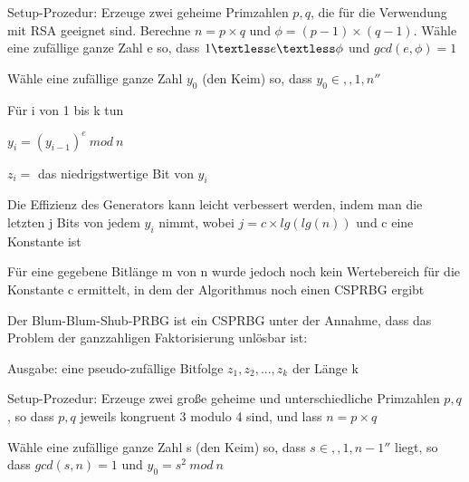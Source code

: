 \documentclass[a4paper]{article}
\begin{document}
\begin{multicols}{3}
\begin{itemize*}
\begin{itemize*}
            \end{itemize*}
            \begin{enumerate*}
                  \item Setup-Prozedur: Erzeuge zwei geheime Primzahlen $p, q$, die für die Verwendung mit RSA geeignet sind. Berechne $n=p\times q$ und $\phi=(p-1)\times(q-1)$. Wähle eine zufällige ganze Zahl e so, dass $1\textless e\textless\phi$ und $gcd(e,\phi)=1$
                  \item Wähle eine zufällige ganze Zahl $y_0$ (den Keim) so, dass $y_0\in ,,1,n''$
                  \item Für i von 1 bis k tun
                  \begin{enumerate*}
                        \item $y_i=(y_{i-1})^e\ mod\ n$
                        \item $z_i =$ das niedrigstwertige Bit von $y_i$
                  \end{enumerate*}
            \end{enumerate*}
            \begin{itemize*}
                  \item Die Effizienz des Generators kann leicht verbessert werden, indem man die letzten j Bits von jedem $y_i$ nimmt, wobei $j=c\times lg(lg(n))$ und c eine Konstante ist
                  \item Für eine gegebene Bitlänge m von n wurde jedoch noch kein Wertebereich für die Konstante c ermittelt, in dem der Algorithmus noch einen CSPRBG ergibt
            \end{itemize*}
            \item Der Blum-Blum-Shub-PRBG ist ein CSPRBG unter der Annahme, dass das Problem der ganzzahligen Faktorisierung unlösbar ist:
            \begin{itemize*}
                  \item Ausgabe: eine pseudo-zufällige Bitfolge $z_1,z_2,...,z_k$ der Länge k
            \end{itemize*}
            \begin{enumerate*}
                  \item Setup-Prozedur: Erzeuge zwei große geheime und unterschiedliche Primzahlen $p,q$, so dass $p,q$ jeweils kongruent 3 modulo 4 sind, und lass $n=p\times q$
                  \item Wähle eine zufällige ganze Zahl s (den Keim) so, dass $s\in ,,1, n-1''$ liegt, so dass $gcd(s,n)=1$ und $y_0=s^2\ mod\ n$

\end{enumerate*}
\end{itemize*}
\end{multicols}
\end{document}
